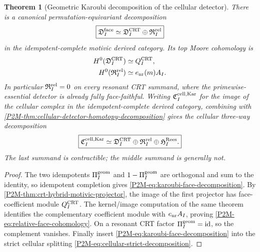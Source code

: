 \documentclass[11pt]{article}
\newtheorem{theorem}{Theorem}[section]
\theoremstyle{remark}
\begin{document}
\begin{theorem}[Geometric Karoubi decomposition of the cellular detector]
\label{P2M-thm:geometric-karoubi-cellular-decomposition}
There is a canonical permutation-equivariant decomposition
\begin{equation}\label{P2M-eq:karoubi-face-decomposition}
 \boxed{
 \mathfrak D_I^{\rm face}
 \simeq
 \mathfrak D_I^{\rm CRT}\oplus\mathfrak R_I^{\rm rel}}
\end{equation}
in the idempotent-complete motivic derived category.  Its top Moore cohomology is
\begin{align}
 H^0(\mathfrak D_I^{\rm CRT})&\simeq Q_I^{\rm CRT},
 \\
 H^0(\mathfrak R_I^{\rm rel})&\simeq e_{\rm nr}(m)A_I.
 \label{P2M-eq:relative-face-cohomology}
\end{align}
In particular \(\mathfrak R_I^{\rm rel}=0\) on every resonant CRT summand,
where the primewise-essential detector is already fully face-faithful.
Writing \(\mathfrak C_I^{\rm cell,Kar}\) for the image of the cellular
complex in the idempotent-complete derived category, combining with
\cref{P2M-thm:cellular-detector-homotopy-decomposition} gives the cellular
three-way decomposition
\begin{equation}
 \boxed{
 \mathfrak C_I^{\rm cell,Kar}
 \simeq
 \mathfrak D_I^{\rm CRT}
 \oplus
 \mathfrak R_I^{\rm rel}
 \oplus
 \mathfrak H_I^{\rm Rees}.}
\end{equation}
The last summand is contractible; the middle summand is generally not.
\end{theorem}

\begin{proof}
The two idempotents
\(\Pi_I^{\rm geom}\) and \(1-\Pi_I^{\rm geom}\) are orthogonal and sum to
the identity, so idempotent completion gives
\eqref{P2M-eq:karoubi-face-decomposition}.  By
\cref{P2M-thm:crt-hybrid-motivic-projector}, the image of the first projector
has face-coefficient module \(Q_I^{\rm CRT}\).  The kernel/image computation
of the same theorem identifies the complementary coefficient module with
\(e_{\rm nr}A_I\), proving
\eqref{P2M-eq:relative-face-cohomology}.  On a resonant CRT factor
\(\Pi_I^{\rm geom}=\operatorname{id}\), so the complement vanishes.  Finally
insert \eqref{P2M-eq:karoubi-face-decomposition} into the strict cellular splitting
\eqref{P2M-eq:cellular-strict-decomposition}.
\end{proof}
\end{document}
